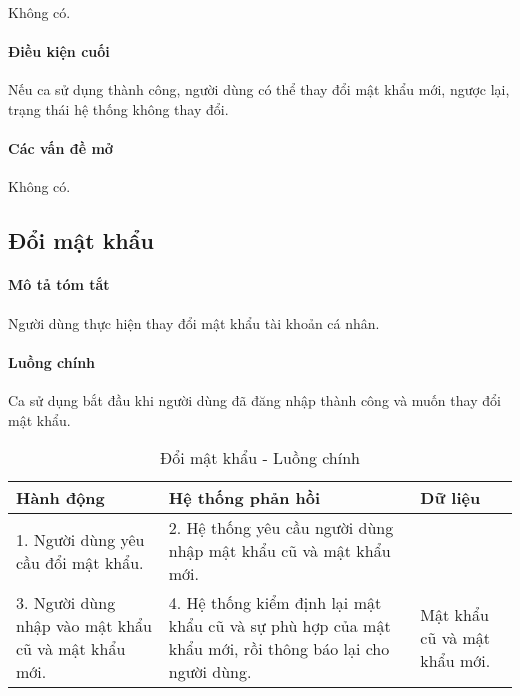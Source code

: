\documentclass[./../main.tex]{subfiles}
\begin{document}
Không có.

\paragraph*{Điều kiện cuối}

Nếu ca sử dụng thành công, người dùng có thể thay đổi mật khẩu mới,
ngược lại, trạng thái hệ thống không thay đổi.

\paragraph*{Các vấn đề mở}

Không có.

\subsection{Đổi mật khẩu}

\paragraph*{Mô tả tóm tắt}

Người dùng thực hiện thay đổi mật khẩu tài khoản cá nhân.


\paragraph*{Luồng chính} Ca sử dụng bắt đầu khi người dùng đã đăng nhập thành công và muốn thay đổi mật khẩu.

\begin{table}[H]
	\caption{Đổi mật khẩu - Luồng chính}
	\label{tab:change_password}
	\begin{tabularx}{\textwidth}{|X|X|X|}
		\hline
		\textbf{Hành động}                                  & \textbf{Hệ thống phản hồi}                                                                              & \textbf{Dữ liệu}             \\ \hline
		1. Người dùng yêu cầu đổi mật khẩu.                 & 2. Hệ thống yêu cầu người dùng nhập mật khẩu cũ và mật khẩu mới.                                        &                              \\ \hline
		3. Người dùng nhập vào mật khẩu cũ và mật khẩu mới. & 4. Hệ thống kiểm định lại mật khẩu cũ và sự phù hợp của mật khẩu mới, rồi thông báo lại cho người dùng. & Mật khẩu cũ và mật khẩu mới. \\ \hline
	\end{tabularx}
\end{table}
\end{document}
